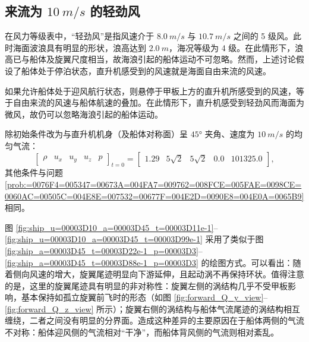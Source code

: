 \subsection{来流为 $\SI{10}{m/s}$ 的轻劲风}

在风力等级表中，“轻劲风”是指风速介于 $\SI{8.0}{m/s}$ 与 $\SI{10.7}{m/s}$ 之间的 5 级风。此时海面波浪具有明显的形状，浪高达到
$\SI{2.0}{m}$，海况等级为 4 级。在此情形下，浪高已与船体及旋翼尺度相当，故海浪引起的船体运动不可忽略。然而，上述讨论假设了船体处于停泊状态，直升机感受到的风速就是海面自由来流的风速。

如果允许船体处于迎风航行状态，则悬停于甲板上方的直升机所感受到的风速，等于自由来流的风速与船体航速的叠加。在此情形下，直升机感受到轻劲风而海面为微风，故仍可以忽略海浪引起的船体运动。
\begin{problem}
[直升机侧面迎轻劲风悬停于甲板中部上方]\label{prob:=0076F4=005347=00673A=004FA7=009762=008FCE=008F7B=0052B2=0098CE=0060AC=00505C=004E8E=007532=00677F=004E2D=0090E8=004E0A=0065B9}除初始条件改为与直升机机身（及船体对称面）呈
$\ang{45}$ 夹角、速度为 $\SI{10}{m/s}$ 的均匀气流：
\begin{equation}
\begin{bmatrix}\rho & u_{x} & u_{y} & u_{z} & p\end{bmatrix}_{t=0}=\begin{bmatrix}1.29 & 5\sqrt{2} & 5\sqrt{2} & 0.0 & 101325.0\end{bmatrix},
\end{equation}
其他条件与问题 \ref{prob:=0076F4=005347=00673A=004FA7=009762=008FCE=005FAE=0098CE=0060AC=00505C=004E8E=007532=00677F=004E2D=0090E8=004E0A=0065B9}
相同。
\end{problem}

图 \ref{fig:ship_u=00003D10_a=00003D45_t=00003D11e-1}–\ref{fig:ship_u=00003D10_a=00003D45_t=00003D99e-1}
采用了类似于图 \ref{fig:ship_a=00003D45_t=00003D22e-1_p=00003D3}–\ref{fig:ship_a=00003D45_t=00003D88e-1_p=00003D3}
的绘图方式。可以看出：随着侧向风速的增大，旋翼尾迹明显向下游延伸，且起动涡不再保持环状。值得注意的是，这里的旋翼尾迹具有明显的非对称性：旋翼左侧的涡结构几乎不受甲板影响，基本保持如孤立旋翼前飞时的形态（如图
\ref{fig:forward_Q_y_view}–\ref{fig:forward_Q_z_view} 所示）；旋翼右侧的涡结构与船体气流尾迹的涡结构相互缠绕，二者之间没有明显的分界面。造成这种差异的主要原因在于船体两侧的气流不对称：船体迎风侧的气流相对“干净”，而船体背风侧的气流则相对紊乱。

